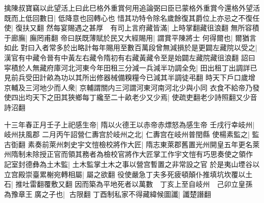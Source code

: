 擒陳叔寶竊以此望活上曰此巳格外重賞何用追論弼曰臣已蒙格外重賞今還格外望活既而上低回數日|{
	低降意也回轉心也}
惜其功特令除名歲餘復其爵位上亦忌之不復任使|{
	復扶又翻}
然每宴賜遇之甚厚　有司上言府藏皆滿|{
	上時掌翻藏徂浪翻}
無所容積于廊廡|{
	廡罔甫翻}
帝曰朕既薄賦於民又大經賜用|{
	謂賞平陳將士}
何得爾也|{
	爾猶言如此}
對曰入者常多於出略計每年賜用至數百萬段曾無減損於是更闢左藏院以受之|{
	漢官有中藏令晉有中黃左右藏令隋初有右藏黃藏令至是始闢左藏院藏徂浪翻}
詔曰寜積於人無藏府庫河北河東今年田租三分減一兵減半功調全免|{
	田出租丁出調詳已見前兵受田計畝為功以其所出修器械備糗糧今已減其半調徒弔翻}
時天下戶口歲增京輔及三河地少而人衆|{
	京輔謂關内三河謂河東河南河北少與小同}
衣食不給帝乃發使四出均天下之田其狹鄉每丁纔至二十畝老少又少焉|{
	使疏吏翻老少詩照翻又少音詩沼翻}


十三年春正月壬子上祀感生帝|{
	隋以火德王以赤帝赤熛怒為感生帝}
壬戌行幸岐州|{
	岐州扶風郡}
二月丙午詔營仁夀宫於岐州之北|{
	仁夀宫在岐州普閏縣}
使楊素監之|{
	監古衘翻}
素奏前萊州刺史宇文愷檢校將作大匠|{
	隋志東萊郡舊置光州開皇五年更名萊州隋制未除授正官而領其務者為檢校官將作大匠掌工作宇文愷有巧思奏使之領作}
記室封德彝為土木監|{
	土木監掌土木之事以營宫暫置之非常設之官}
於是夷山堙谷以立宫殿崇臺累榭宛轉相屬|{
	屬之欲翻}
役使嚴急丁夫多死疲頓顛仆推填坑坎覆以土石|{
	推吐雷翻覆敷又翻}
因而築為平地死者以萬數　丁亥上至自岐州　己卯立皇孫為豫章王廣之子也|{
	古限翻}
丁酉制私家不得藏緯候圖讖|{
	讖楚譖翻}

